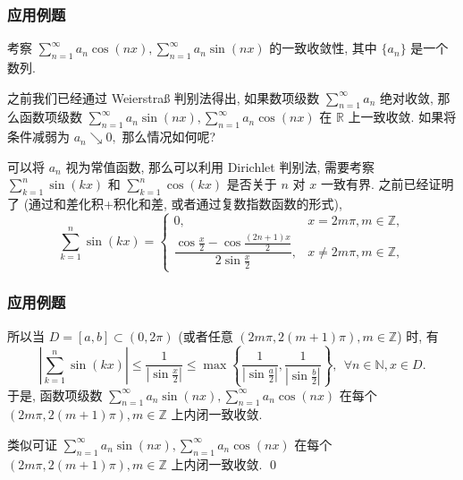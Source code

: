 
\begin{frame}
\frametitle{应用例题}

\begin{eg}
考察 $\sum_{n=1}^\infty a_n \cos (n x), \sum_{n=1}^\infty a_n \sin (n x)$ 的一致收敛性, 其中 $\{a_n\}$ 是一个数列.
\end{eg}

\pause
\vspace{0.5em}

之前我们已经通过 Weierstraß 判别法得出, 如果数项级数 $\sum_{n=1}^\infty a_n$ 绝对收敛, 那么函数项级数 $\displaystyle \sum_{n=1}^\infty a_n \sin (n x), \sum_{n=1}^\infty a_n \cos (n x)$ 在 $\mathbb{R}$ 上一致收敛. 如果将条件减弱为 $a_n \searrow 0,$ 那么情况如何呢?

\pause
\vspace{0.5em}

可以将 $a_n$ 视为常值函数, 那么可以利用 Dirichlet 判别法, 需要考察 $\sum_{k=1}^n \sin (k x)$ 和 $\sum_{k=1}^n \cos (k x)$ 是否关于 $n$ 对 $x$ 一致有界. 之前已经证明了 (通过和差化积+积化和差, 或者通过复数指数函数的形式),
\[
\sum_{k=1}^n \sin (k x) = \begin{cases}
0, & x = 2m\pi, m \in \mathbb{Z}, \\
\dfrac{\cos\frac{x}{2} - \cos\frac{(2n+1)x}{2}}{2\sin\frac{x}{2}}, & x \neq 2m\pi, m \in \mathbb{Z},
\end{cases}
\]

\end{frame}


\begin{frame}
\frametitle{应用例题}

所以当 $D = [a, b] \subset (0, 2\pi)$ (或者任意 $(2m\pi, 2(m+1)\pi), m \in \mathbb{Z}$) 时, 有
\[
\left| \sum_{k=1}^n \sin (k x) \right| \leqslant \frac{1}{\left|\sin\frac{x}{2}\right|} \leqslant \max\left\{ \frac{1}{\left|\sin\frac{a}{2}\right|}, \frac{1}{\left|\sin\frac{b}{2}\right|} \right\}, ~~ \forall n \in \mathbb{N}, x \in D.
\]
于是, 函数项级数 $\displaystyle \sum_{n=1}^\infty a_n \sin (n x), \sum_{n=1}^\infty a_n \cos (n x)$ 在每个 $(2m\pi, 2(m+1)\pi), m \in \mathbb{Z}$ 上\alert{内闭一致收敛}.

类似可证 $\displaystyle \sum_{n=1}^\infty a_n \sin (n x), \sum_{n=1}^\infty a_n \cos (n x)$ 在每个 $(2m\pi, 2(m+1)\pi), m \in \mathbb{Z}$ 上内闭一致收敛.
\qed

\end{frame}

